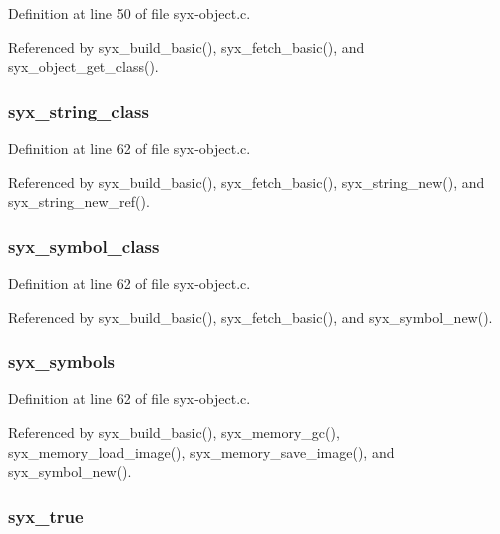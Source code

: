 Definition at line 50 of file syx-object.c.

Referenced by syx\_\-build\_\-basic(), syx\_\-fetch\_\-basic(), and syx\_\-object\_\-get\_\-class().\hypertarget{syx-object_8c_3ecb65cb20e0a5a895c3b5ff2f8b2c0b}{
\subsubsection{ {\bf syx\_\-string\_\-class}}}
\label{syx-object_8c_3ecb65cb20e0a5a895c3b5ff2f8b2c0b}




Definition at line 62 of file syx-object.c.

Referenced by syx\_\-build\_\-basic(), syx\_\-fetch\_\-basic(), syx\_\-string\_\-new(), and syx\_\-string\_\-new\_\-ref().\hypertarget{syx-object_8c_1848105ff104416a12408af2205143e9}{
\subsubsection{ {\bf syx\_\-symbol\_\-class}}}
\label{syx-object_8c_1848105ff104416a12408af2205143e9}




Definition at line 62 of file syx-object.c.

Referenced by syx\_\-build\_\-basic(), syx\_\-fetch\_\-basic(), and syx\_\-symbol\_\-new().\hypertarget{syx-object_8c_4b5e97a130b1cf431ef9ea589afc5cfc}{
\subsubsection{ {\bf syx\_\-symbols}}}
\label{syx-object_8c_4b5e97a130b1cf431ef9ea589afc5cfc}




Definition at line 62 of file syx-object.c.

Referenced by syx\_\-build\_\-basic(), syx\_\-memory\_\-gc(), syx\_\-memory\_\-load\_\-image(), syx\_\-memory\_\-save\_\-image(), and syx\_\-symbol\_\-new().\hypertarget{syx-object_8c_420b624002efae10b26b6ae50e4a2676}{
\subsubsection{ {\bf syx\_\-true}}}
\label{syx-object_8c_420b624002efae10b26b6ae50e4a2676}




